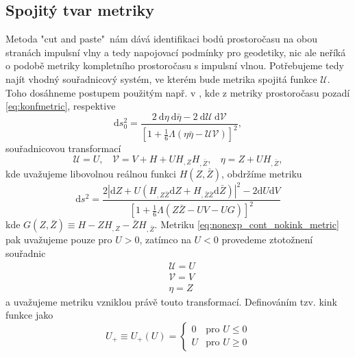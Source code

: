 \subsection{Spojitý tvar metriky}
Metoda "cut and paste"\ nám dává identifikaci bodů prostoročasu na obou stranách impulsní vlny a tedy napojovací podmínky
pro geodetiky, nic ale neříká o podobě metriky kompletního prostoročasu s impulsní vlnou. Potřebujeme tedy najít vhodný
souřadnicový systém, ve kterém bude metrika spojitá funkce $\mathcal{U}$. Toho dosáhneme postupem použitým např. v
\cite{Podolsky:2014ysa}, kde z metriky prostoročasu pozadí \eqref{eq:konfmetric}, respektive
\begin{equation}
    \label{eq:null_background_metric}
    \mathrm{d}s_0^2 = \frac{2~\mathrm{d}\eta~\mathrm{d}\bar{\eta}-2~\mathrm{d}\mathcal{U}~\mathrm{d}\mathcal{V}}
    {\left[1+\frac{1}{6}\Lambda \left(\eta \bar{\eta}
    -\mathcal{U}\mathcal{V}\right)\right]^2},
\end{equation}
souřadnicovou transformací
\begin{equation}
    \label{eq:nonexp_cont_transform}
    \mathcal{U}=U,~~~~ \mathcal{V}=V+H+UH_{,Z}H_{,\bar{Z}},~~~~ \eta=Z+UH_{,\bar{Z}},
\end{equation}
kde uvažujeme libovolnou reálnou funkci $H(Z, \bar{Z})$, obdržíme metriku
\begin{equation}
    \label{eq:nonexp_cont_nokink_metric}
    \mathrm{d} s^{2}=\frac{2\left|\mathrm{d} Z+U\left(H_{, Z \bar{Z}} 
    \mathrm{d} Z+H_{, \bar{Z} \bar{Z}} \mathrm{d} \bar{Z}\right)\right|^{2}-2 \mathrm{d} U 
    \mathrm{d} V}{\left[1+\frac{1}{6} \Lambda(Z \bar{Z}-U V-U G)\right]^{2}}
\end{equation}
kde $G(Z, \bar{Z}) \equiv H - Z H_{,Z}-\bar{Z}H_{,\bar{Z}}$. Metriku \eqref{eq:nonexp_cont_nokink_metric} pak 
uvažujeme pouze pro $U>0$, zatímco na $U<0$ provedeme ztotožnení souřadnic
\begin{equation}
    \label{eq:transformation_just_rename}
    \begin{split}
        &\mathcal{U} = U \\
        &\mathcal{V} = V \\
        &\eta = Z
    \end{split}
\end{equation}
a uvažujeme metriku vzniklou právě touto transformací.
Definováním
tzv. kink funkce jako
\begin{equation}
    \label{eq:kink_function}
    U_+ \equiv U_+(U) = \begin{cases}
        0 & \text{pro } U \leq 0 \\
        U & \text{pro } U \geq 0
    \end{cases}
\end{equation}
